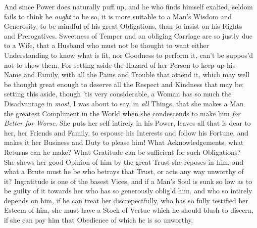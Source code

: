 And since Power does naturally puff up, and he who finds himself
exalted, seldom fails to think he \textit{ought} to be so, it is more
suitable to a Man's Wisdom  and Generosity, to be mindful of
his great Obligations, than to insist on his Rights and Prerogatives.
Sweetness of Temper and an obliging Carriage are so justly due to a
Wife, that a Husband who must not be thought to want either
Understanding to know what is fit, nor Goodness to perform it, can't
be suppos'd not to shew them. For setting aside the Hazard of her
Person to keep up his Name and Family, with all the Pains and Trouble
that attend it, which may well be thought great enough to deserve all
the Respect and Kindness that may be; setting this aside, though 'tis
very considerable, a Woman has so much the Disadvantage in
\textit{most}, I was about to say, in \textit{all} Things, that she
makes a Man the greatest Compliment in the World when she condescends
to make him \textit{for Better for Worse}. She puts her self intirely
in his Power, leaves all that is dear to her, her Friends and Family,
to espouse his Interests and follow his Fortune, and makes it her
Business and Duty to please him! What Acknowledgements,  what
Returns can he make? What Gratitude can be sufficient for such
Obligations? She shews her good Opinion of him by the great Trust she
reposes in him, and what a Brute must he be who betrays that Trust, or
acts any way unworthy of it? Ingratitude is one of the basest Vices,
and if a Man's Soul is sunk so low as to be guilty of it towards her
who has so generously oblig'd him, and who so intirely depends on him,
if he can treat her discrepectfully, who has so fully testified her
Esteem of him, she must have a Stock of Vertue which he should blush
to discern, if she can pay him that Obedience of which he is so
unworthy.

